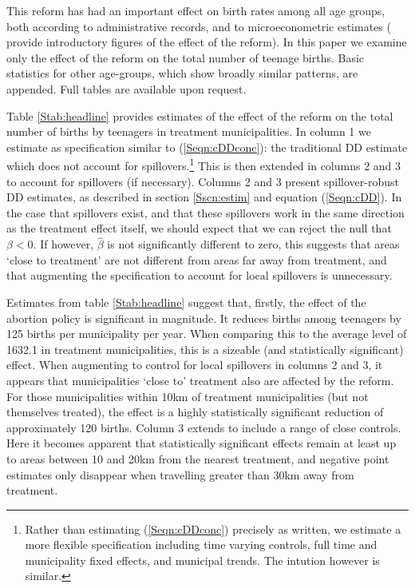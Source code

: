 \documentclass{article}
\begin{document}
\begin{spacing}{1.3}
This reform has had an important effect on birth rates among all age groups,
both according to administrative records, and to microeconometric estimates
(\citet{ClarkeMuhlrad2014} provide introductory figures of the effect of the
reform).  In this paper we examine only the effect of the reform on the total
number of teenage births.  Basic statistics for other age-groups, which show 
broadly similar patterns, are appended.  Full tables are available upon 
request.

Table \ref{Stab:headline} provides estimates of the effect of the reform on
the total number of births by teenagers in treatment municipalities.  In 
column 1 we estimate as specification similar to (\ref{Seqn:cDDconc}): the 
traditional DD estimate which does not account for spillovers.\footnote{Rather 
than estimating (\ref{Seqn:cDDconc}) precisely as written, we estimate a more 
flexible specification including time varying controls, full time and
municipality fixed effects, and municipal trends.  The intution however is
similar.}  This is then extended in columns 2 and 3 to account for spillovers
(if necessary).  Columns 2 and 3 present spillover-robust DD estimates, as 
described in section \ref{Sscn:estim} and equation (\ref{Seqn:cDD}).  In the
case that spillovers exist, and that these spillovers work in the same 
direction as the treatment effect itself, we should expect that we can reject
the null that $\beta<0$.  If however, $\hat\beta$ is not significantly 
different to zero, this suggests that areas `close to treatment' are not
different from areas far away from treatment, and that augmenting the 
specification to account for local spillovers is unnecessary.



Estimates from table \ref{Stab:headline} suggest that, firstly, the effect of
the abortion policy is significant in magnitude.  It reduces births among 
teenagers by 125 births per municipality per year. When comparing this to the
average level of 1632.1 in treatment municipalities, this is a sizeable (and
statistically significant) effect.  When augmenting to control for local
spillovers in columns 2 and 3, it appears that municipalities `close to' 
treatment also are affected by the reform.  For those municipalities within
10km of treatment municipalities (but not themselves treated), the effect is 
a highly statistically significant reduction of approximately 120 births.
Column 3 extends to include a range of close controls.  Here it becomes
apparent that statistically significant effects remain at least up to areas
between 10 and 20km from the nearest treatment, and negative point estimates
only disappear when travelling greater than 30km away from treatment.


\end{spacing}
\end{document}
